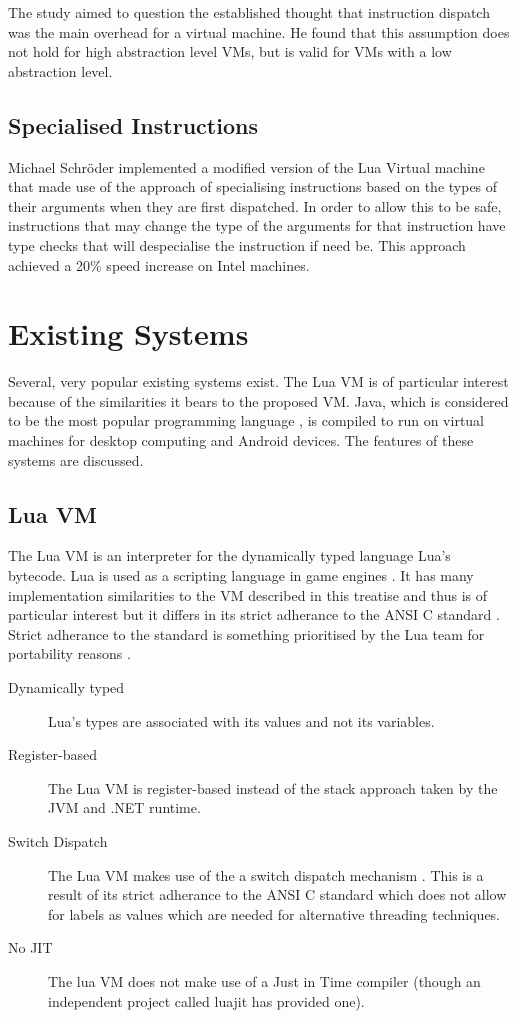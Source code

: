 \documentclass[english,a4paper,12pt]{report}
\begin{document}
The study aimed to question the established thought that instruction
dispatch was the main overhead for a virtual machine. He found that
this assumption does not hold for high abstraction level VMs, but is
valid for VMs with a low abstraction level.

\subsection{Specialised Instructions}

Michael Schr{\"o}der implemented a modified version of the Lua Virtual
machine that made use of the approach of specialising instructions
based on the types of their arguments when they are first
dispatched. In order to allow this to be safe, instructions that may
change the type of the arguments for that instruction have type checks
that will despecialise the instruction if need be. This approach
achieved a 20\% speed increase on Intel machines\cite{Schroder2012}.

\section{Existing Systems}
\label{sec:existing-systems}

Several, very popular existing systems exist. The Lua VM is of
particular interest because of the similarities it bears to the
proposed VM. Java, which is considered to be the most popular
programming language \cite{java-pop}, is compiled to run on virtual
machines for desktop computing and Android devices. The features of
these systems are discussed.

\subsection{Lua VM}

The Lua VM is an interpreter for the dynamically typed language Lua's
bytecode. Lua is used as a scripting language in game engines
\cite{LuaUsed}. It has many implementation similarities to the VM
described in this treatise and thus is of particular interest but it
differs in its strict adherance to the ANSI C standard
\cite{RobertoIerusalimschy}. Strict adherance to the standard is
something prioritised by the Lua team for portability reasons
\cite{RobertoIerusalimschy}.
\begin{description}
\item[Dynamically typed] Lua's types are associated with its values
  and not its variables.
\item[Register-based] The Lua VM is register-based instead of the
  stack approach taken by the JVM and .NET runtime.
\item[Switch Dispatch] The Lua VM makes use of the a switch dispatch
  mechanism \cite{Lua.Source}. This is a result of its strict
  adherance to the ANSI C standard which does not allow for labels as
  values which are needed for alternative threading techniques.
\item[No JIT] The lua VM does not make use of a Just in Time compiler
  (though an independent project called luajit has provided one).
\end{description}
\end{document}
